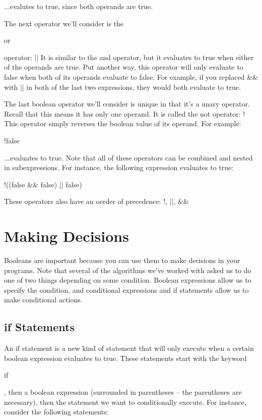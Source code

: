 ...evalutes to true, since both operands are true.

The next operator we'll consider is the \begin{textit}or\end{textit} operator: $||$ It is similar to the and operator, but it evaluates to true when either of the operands are true. Put another way, this operator will only evaluate to false when both of its operands evaluate to false. For example, if you replaced \&\& with $||$ in both of the last two expressions, they would both evaluate to true.

The last boolean operator we'll consider is unique in that it's a unary operator. Recall that this means it has only one operand. It is called the not operator: !   This operator simply reverses the boolean value of its operand. For example:

\begin{code}

!false

\end{code}

...evaluates to true. Note that all of these operators can be combined and nested in subexpressions. For instance, the following expression evaluates to true:

\begin{code}

!((false && false) || false)

\end{code}

These operators also have an oerder of precedence: !, $||$, \&\&

\section{Making Decisions}

Booleans are important because you can use them to make decisions in your programs. Note that several of the algorithms we've worked with asked us to do one of two things depending on some condition. Boolean expressions allow us to specify the condition, and conditional expressions and if statements allow us to 
make conditional actions. 

\subsection{if Statements}

An if statement is a new kind of statement that will only execute when a certain boolean expression evaluates to true. These statements start with the keyword \begin{textbf}if\end{textbf}, then a boolean expression (surrounded in parentheses -- the parentheses are necessary), then the statement we want to conditionally execute. For instance, consider the following statements:


